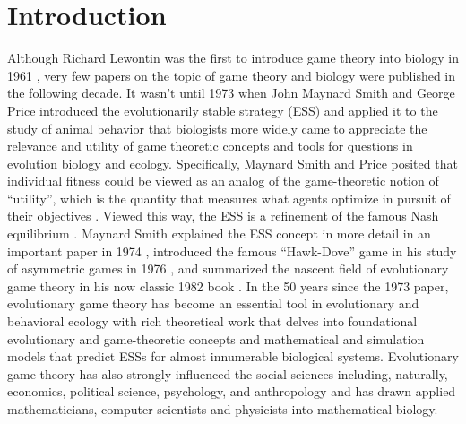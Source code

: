 \documentclass[11pt]{article}
\begin{document}
\clearpage
\section{Introduction}

Although Richard Lewontin was the first to introduce game theory into biology in 1961 \cite{Lewontin:1961}, very few papers on the topic of game theory and biology were published in the following decade. It wasn't until 1973 when John Maynard Smith and George Price introduced the evolutionarily stable strategy (ESS) and applied it to the study of animal behavior \cite{Maynard-Smith:Price:1973} that biologists more widely came to appreciate the relevance and utility of game theoretic concepts and tools for questions in evolution biology and ecology. Specifically, Maynard Smith and Price posited that individual fitness could be viewed as an analog of the game-theoretic notion of ``utility'', which is the quantity that measures what agents optimize in pursuit of their objectives \cite{Myerson:1991}. Viewed this way, the ESS is a refinement of the famous Nash equilibrium \cite{Nash:1950}. Maynard Smith explained the ESS concept in more detail in an important paper in 1974 \cite{Maynard-Smith:1974}, introduced the famous ``Hawk-Dove'' game in his study of asymmetric games in 1976 \cite{Maynard-Smith:Parker:1976}, and summarized the nascent field of evolutionary game theory in his now classic 1982 book \cite{MaynardSmith:1982}. In the 50 years since the 1973 paper, evolutionary game theory has become an essential tool in evolutionary and behavioral ecology with rich theoretical work that delves into foundational evolutionary and game-theoretic concepts and mathematical and simulation models that predict ESSs for almost innumerable biological systems. Evolutionary game theory has also strongly influenced the social sciences including, naturally, economics, political science, psychology, and anthropology and has drawn applied mathematicians, computer scientists and physicists into mathematical biology.
\end{document}
